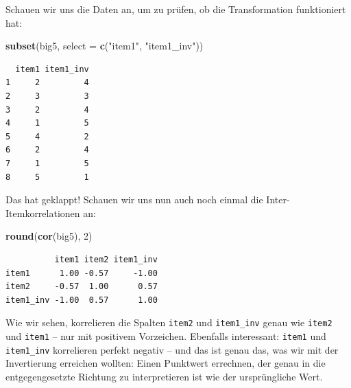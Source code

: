 \documentclass[12pt,]{tufte-book}
\newenvironment{Shaded}{\begin{snugshade}}{\end{snugshade}}
\newcommand{\KeywordTok}[1]{\textcolor[rgb]{0.13,0.29,0.53}{\textbf{#1}}}
\newcommand{\DataTypeTok}[1]{\textcolor[rgb]{0.13,0.29,0.53}{#1}}
\newcommand{\DecValTok}[1]{\textcolor[rgb]{0.00,0.00,0.81}{#1}}
\newcommand{\StringTok}[1]{\textcolor[rgb]{0.31,0.60,0.02}{#1}}
\newcommand{\CommentTok}[1]{\textcolor[rgb]{0.56,0.35,0.01}{\textit{#1}}}
\newcommand{\OperatorTok}[1]{\textcolor[rgb]{0.81,0.36,0.00}{\textbf{#1}}}
\newcommand{\NormalTok}[1]{#1}
\theoremstyle{definition}
\theoremstyle{definition}
\theoremstyle{definition}
\theoremstyle{remark}
\begin{document}
\begin{Shaded}
\end{Shaded}

Schauen wir uns die Daten an, um zu prüfen, ob die Transformation
funktioniert hat:

\begin{Shaded}
\begin{Highlighting}[]
\KeywordTok{subset}\NormalTok{(big5, }\DataTypeTok{select =} \KeywordTok{c}\NormalTok{(}\StringTok{"item1"}\NormalTok{, }\StringTok{"item1_inv"}\NormalTok{))}
\end{Highlighting}
\end{Shaded}

\begin{verbatim}
  item1 item1_inv
1     2         4
2     3         3
3     2         4
4     1         5
5     4         2
6     2         4
7     1         5
8     5         1
\end{verbatim}

Das hat geklappt! Schauen wir uns nun auch noch einmal die
Inter-Itemkorrelationen an:

\begin{Shaded}
\begin{Highlighting}[]
\KeywordTok{round}\NormalTok{(}\KeywordTok{cor}\NormalTok{(big5), }\DecValTok{2}\NormalTok{)}
\end{Highlighting}
\end{Shaded}

\begin{verbatim}
          item1 item2 item1_inv
item1      1.00 -0.57     -1.00
item2     -0.57  1.00      0.57
item1_inv -1.00  0.57      1.00
\end{verbatim}

Wie wir sehen, korrelieren die Spalten \texttt{item2} und
\texttt{item1\_inv} genau wie \texttt{item2} und \texttt{item1} -- nur
mit positivem Vorzeichen. Ebenfalls interessant: \texttt{item1} und
\texttt{item1\_inv} korrelieren perfekt negativ -- und das ist genau
das, was wir mit der Invertierung erreichen wollten: Einen Punktwert
errechnen, der genau in die entgegengesetzte Richtung zu interpretieren
ist wie der ursprüngliche Wert.
\end{document}
